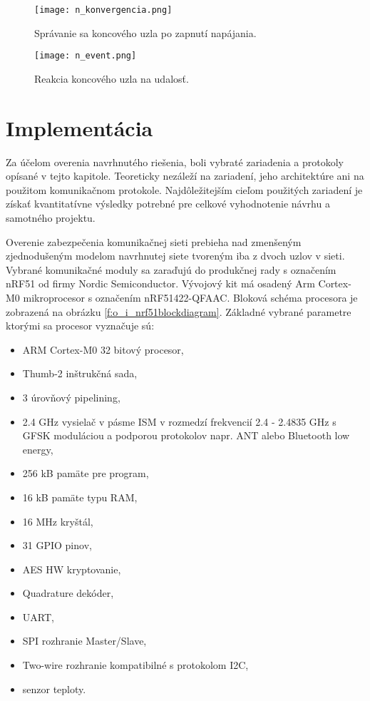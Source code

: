 \documentclass[12pt,a4wide,oneside,openright]{report}
\begin{document}
\begin{figure*}[h]
	\centering
	\texttt{[image: n\_konvergencia.png]}
	\caption{Správanie sa koncového uzla po zapnutí napájania.}
	\label{f:o_konvergencia}
\end{figure*}

\begin{figure*}[h]
	\centering
	\texttt{[image: n\_event.png]}
	\caption{Reakcia koncového uzla na udalosť.}
	\label{f:o_event}
\end{figure*}



\chapter{Implementácia} \label{s_implementation}
Za účelom overenia navrhnutého riešenia, boli vybraté zariadenia a protokoly opísané v tejto kapitole. Teoreticky nezáleží na zariadení, jeho architektúre ani na použitom komunikačnom protokole. Najdôležitejším cieľom použitých zariadení je získať kvantitatívne výsledky potrebné pre celkové vyhodnotenie návrhu a samotného projektu.

Overenie zabezpečenia komunikačnej sieti prebieha nad zmenšeným zjednodušeným modelom navrhnutej siete tvoreným iba z dvoch uzlov v sieti. Vybrané komunikačné moduly sa zaraďujú do produkčnej rady s označením nRF51 od firmy Nordic Semiconductor. Vývojový kit má osadený Arm Cortex-M0 mikroprocesor s označením nRF51422-QFAAC. Bloková schéma procesora je zobrazená na obrázku \ref{f:o_i_nrf51blockdiagram}. Základné vybrané parametre ktorými sa procesor vyznačuje sú\cite{nRF51}:
\begin{itemize}
	\item ARM Cortex-M0 32 bitový procesor,
	\item Thumb-2 inštrukčná sada,
	\item 3 úrovňový pipelining,
	\item 2.4 GHz vysielač v pásme ISM v rozmedzí frekvencií 2.4 - 2.4835 GHz s GFSK moduláciou a podporou protokolov napr. ANT alebo Bluetooth low energy,
	\item 256 kB pamäte pre program,
	\item 16 kB pamäte typu RAM,
	\item 16 MHz kryštál,
	\item 31 GPIO pinov,
	\item AES HW kryptovanie,
	\item Quadrature dekóder,
	\item UART,
	\item SPI rozhranie Master/Slave,
	\item Two-wire rozhranie kompatibilné s protokolom I2C,
	\item senzor teploty.
\end{itemize}
\onehalfspacing
\end{document}
